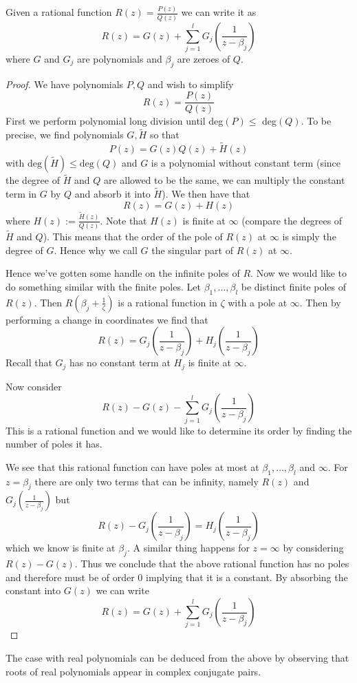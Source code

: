 \begin{theorem}
Given a rational function $R(z) = \frac{P(z)}{Q(z)}$ we can write it as
$$R(z) = G(z) + \sum_{j = 1}^l G_j \left( \frac{1}{z - \beta_j} \right)$$
where $G$ and $G_j$ are polynomials and $\beta_j$ are zeroes of $Q$.
\end{theorem}
\begin{proof}
We have polynomials $P, Q$ and wish to simplify
$$R(z) = \frac{P(z)}{Q(z)}$$
First we perform polynomial long division until deg$(P) \leq$ deg$(Q)$. To be precise, we find polynomials $G, \widetilde{H}$ so that
$$P(z) = G(z) Q(z) + \widetilde{H}(z)$$
with $\text{deg}(\widetilde{H}) \leq \text{deg}(Q)$ and $G$ is a polynomial without constant term (since the degree of $\widetilde{H}$ and $Q$ are allowed to be the same, we can multiply the constant term in $G$ by $Q$ and absorb it into $\widetilde{H}$). We then have that
$$R(z) = G(z) + H(z)$$
where $H(z) := \frac{\widetilde{H}(z)}{Q(z)}$. Note that $H(z)$ is finite at $\infty$ (compare the degrees of $\widetilde{H}$ and $Q$). This means that the order of the pole of $R(z)$ at $\infty$ is simply the degree of $G$. Hence why we call $G$ the singular part of $R(z)$ at $\infty$. 

Hence we've gotten some handle on the infinite poles of $R$. Now we would like to do something similar with the finite poles. Let $\beta_1, \dots, \beta_l$ be distinct finite poles of $R(z)$. Then $R \left(\beta_j + \frac{1}{\zeta} \right)$ is a rational function in $\zeta$ with a pole at $\infty$. Then by performing a change in coordinates we find that
$$R \left(z \right) = G_j \left(\frac{1}{z - \beta_j} \right) + H_j\left(\frac{1}{z -\beta_j}\right)$$
Recall that $G_j$ has no constant term at $H_j$ is finite at $\infty$.

Now consider 
$$R(z) - G(z) - \sum_{j = 1}^l G_j \left( \frac{1}{z - \beta_j} \right)$$
This is a rational function and we would like to determine its order by finding the number of poles it has. 

We see that this rational function can have poles at most at $\beta_1, \dots, \beta_l$ and $\infty$. For $z = \beta_j$ there are only two terms that can be infinity, namely $R(z)$ and $G_j(\frac{1}{z - \beta_j})$ but
$$ R(z) -  G_j \left( \frac{1}{z - \beta_j} \right) = H_j \left(\frac{1}{z - \beta_j}\right)$$
which we know is finite at $\beta_j$. A similar thing happens for $z = \infty$ by considering $R(z) - G(z)$. Thus we conclude that the above rational function has no poles and therefore must be of order 0 implying that it is a constant. By absorbing the constant into $G(z)$ we can write
$$ R(z) = G(z) + \sum_{j = 1}^l G_j \left( \frac{1}{z - \beta_j} \right) $$
\end{proof}
\begin{remark}
The case with real polynomials can be deduced from the above by observing that roots of real polynomials appear in complex conjugate pairs.
\end{remark}

